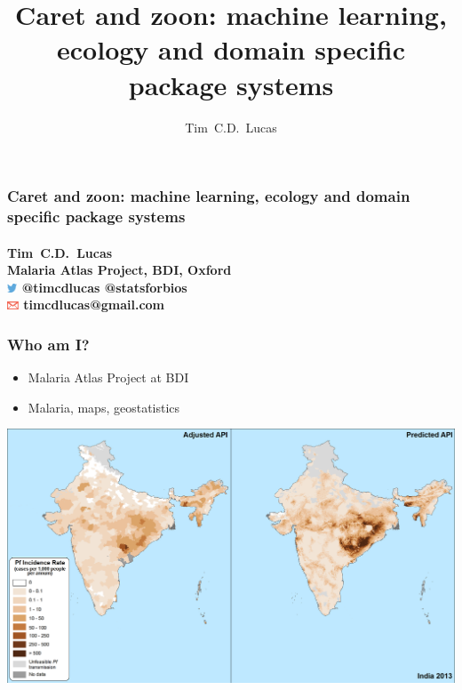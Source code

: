 \documentclass{beamer}
\title %
{\textbf{Caret and zoon}: machine learning, ecology and domain specific package systems}
\author %
{Tim~\small{C.D.}~\normalsize{Lucas}}
\institute %
{
  Malaria Atlas Project\\
  Oxford
}
\begin{document}
\begin{frame}

\frametitle{\textbf{Caret and zoon}: machine learning, ecology and domain specific package systems
\\}
\vspace{3cm}
\framesubtitle{{\color{black} \normalsize{Tim}~\small{C.D.}~\normalsize{Lucas}
\hbox{}\\
\vspace{3mm}
{\small Malaria Atlas Project, BDI, Oxford}}\\
\includegraphics[height=7pt]{Twitter_logo_blue-small.png}{\color{black} \hspace{0.6mm}\footnotesize{@}\small{timcdlucas}  \footnotesize{@}\small{statsforbios}}\\
\includegraphics[height=7pt]{Ar_Icon_Contact.pdf}{\color{black}  \hspace{0.6mm}\small{timcdlucas}\footnotesize{@}\small{gmail.com}}}

\vspace{-3cm}
%
\end{frame}




\begin{frame}
\frametitle{Who am I?}
	\begin{itemize}
	\item Malaria Atlas Project at BDI
	\item Malaria, maps, geostatistics

	\end{itemize}	
	\centerline{
    \includegraphics[width=0.8\paperwidth]{03_Country_Comparison_API_India.png}
	}
\end{frame} 
\end{document}
